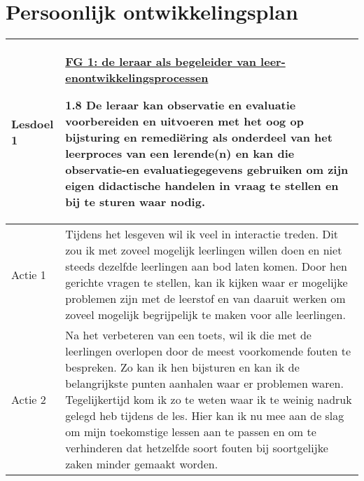 
\section{Persoonlijk ontwikkelingsplan}
\begin{tabularx}{\textwidth}{|p{}|p{}|}
	\hline
	\textbf{Lesdoel 1} & 
	\underline{FG 1: de leraar als begeleider van leer- en}\newline \underline{ontwikkelingsprocessen}\newline
	
	1.8 De leraar kan observatie en evaluatie voorbereiden en uitvoeren met het oog op bijsturing en remediëring als onderdeel van het leerproces van een lerende(n) en kan die observatie-en evaluatiegegevens gebruiken om zijn eigen didactische handelen in vraag te stellen en bij te sturen waar nodig.\\ \hline
	Actie 1 & Tijdens het lesgeven wil ik veel in interactie treden. Dit zou ik met zoveel mogelijk leerlingen willen doen en niet steeds dezelfde leerlingen aan bod laten komen. Door hen gerichte vragen te stellen, kan ik kijken waar er mogelijke problemen zijn met de leerstof en van daaruit werken om zoveel mogelijk begrijpelijk te maken voor alle leerlingen. \\ \hline
	Actie 2 & Na het verbeteren van een toets, wil ik die met de leerlingen overlopen door de meest voorkomende fouten te bespreken. Zo kan ik hen bijsturen en kan ik de belangrijkste punten aanhalen waar er problemen waren. Tegelijkertijd kom ik zo te weten waar ik te weinig nadruk gelegd heb tijdens de les. Hier kan ik nu mee aan de slag om mijn toekomstige lessen aan te passen en om te verhinderen dat hetzelfde soort fouten bij soortgelijke zaken minder gemaakt worden. \\ \hline
\end{tabularx}



